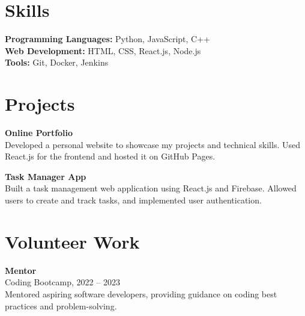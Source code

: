 \section*{Skills}
\noindent
\textbf{Programming Languages:} Python, JavaScript, C++ \\
\textbf{Web Development:} HTML, CSS, React.js, Node.js \\
\textbf{Tools:} Git, Docker, Jenkins

\section*{Projects}
\noindent
\textbf{Online Portfolio} \\
Developed a personal website to showcase my projects and technical skills. Used React.js for the frontend and hosted it on GitHub Pages.

\noindent
\textbf{Task Manager App} \\
Built a task management web application using React.js and Firebase. Allowed users to create and track tasks, and implemented user authentication.

\section*{Volunteer Work}
\noindent
\textbf{Mentor} \\
Coding Bootcamp, 2022 -- 2023 \\
Mentored aspiring software developers, providing guidance on coding best practices and problem-solving.


